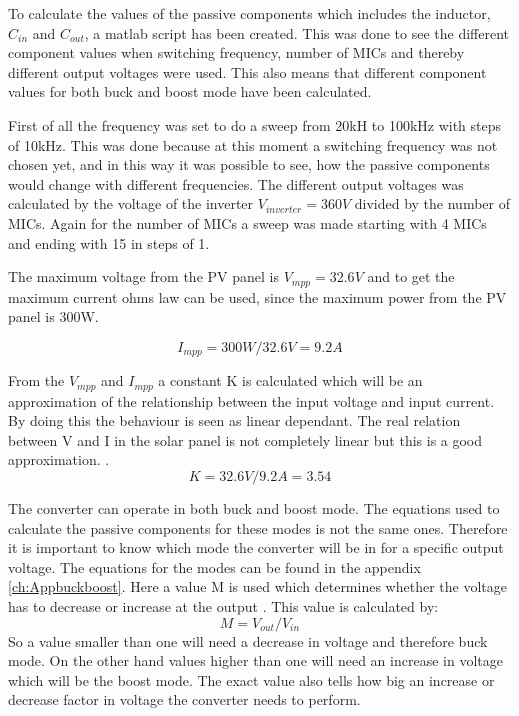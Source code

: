 To calculate the values of the passive components which includes the inductor, $C_{in}$ and $C_{out}$, a matlab  script has been created. This was done to see the different component values when switching frequency, number of MICs and thereby different output voltages were used. This also means that different component values for both buck and boost mode have been calculated.

First of all the frequency was set to do a sweep from 20kH to 100kHz with steps of 10kHz. This was done because at this moment a switching frequency was not chosen yet, and in this way it was possible to see, how the passive components would change with different frequencies. 
The different output voltages was calculated by the voltage of the inverter $V_{inverter}=360V$ divided by the number of MICs. Again for the number of MICs a sweep was made starting with 4 MICs and ending with 15 in steps of 1.

The maximum voltage from the PV panel is $V_{mpp}=32.6V$ 
and to get the maximum current ohms law can be used, since the maximum power from the PV panel is 300W.

\begin{equation}
I_{mpp} = 300W/32.6V = 9.2A
\end{equation} 

From the $V_{mpp}$ and $I_{mpp}$ a constant K is calculated which will be an approximation of the relationship between the input voltage and input current.
By doing this the behaviour is seen as linear dependant. The real relation between V and I in the solar panel is not completely linear but this is a good approximation. .
\begin{equation}
 K = 32.6V/9.2A = 3.54
 \end{equation} 

The converter can operate in both buck and boost mode. The equations used to calculate the passive components for these modes is not the same ones. Therefore it is important to know which mode the converter will be in for a specific output voltage.  
The equations for the modes can be found in the appendix \ref{ch:Appbuckboost}. Here a value M is used which determines whether the voltage has to decrease or increase at the output . This value is calculated by:
\begin{equation}
M = V_{out}/V_{in}
\end{equation}
So a value smaller than one will need a decrease in voltage and therefore buck mode. On the other hand values higher than one will need an increase in voltage which will be the boost mode. The exact value also tells how big an increase or decrease factor in voltage the converter needs to perform.

